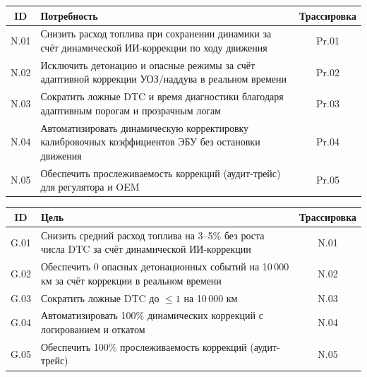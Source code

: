 \documentclass[14pt, a4paper]{extarticle}
\begin{document}
		
		\vspace{\parindent}
		\noindent
		\begin{minipage}{\textwidth}
			\label{tab:needs}
			\begin{tabularx}{\textwidth}{|c|X|c|}
				\hline
				\textbf{ID} & \textbf{Потребность} & \textbf{Трассировка} \\
				\hline
				N.01 & Снизить расход топлива при сохранении динамики за счёт динамической ИИ-коррекции по ходу движения & Pr.01 \\
				\hline
				N.02 & Исключить детонацию и опасные режимы за счёт адаптивной коррекции УОЗ/наддува в реальном времени & Pr.02 \\
				\hline
				N.03 & Сократить ложные DTC и время диагностики благодаря адаптивным порогам и прозрачным логам & Pr.03 \\
				\hline
				N.04 & Автоматизировать динамическую корректировку калибровочных коэффициентов ЭБУ без остановки движения & Pr.04 \\
				\hline
				N.05 & Обеспечить прослеживаемость коррекций (аудит-трейс) для регулятора и OEM & Pr.05 \\
				\hline
			\end{tabularx}
		\end{minipage}
		\vspace{\parindent}
		
		
		\vspace{\parindent}
		\noindent
		\begin{minipage}{\textwidth}
			\label{tab:goals}
			\begin{tabularx}{\textwidth}{|c|X|c|}
				\hline
				ID & Цель & Трассировка \\
				\hline
				G.01 & Снизить средний расход топлива на 3--5\% без роста числа DTC за счёт динамической ИИ-коррекции & N.01 \\
				\hline
				G.02 & Обеспечить 0 опасных детонационных событий на 10\,000 км за счёт коррекции в реальном времени & N.02 \\
				\hline
				G.03 & Сократить ложные DTC до \(\leq 1\) на 10\,000 км & N.03 \\
				\hline
				G.04 & Автоматизировать 100\% динамических коррекций с логированием и откатом & N.04 \\
				\hline
				G.05 & Обеспечить 100\% прослеживаемость коррекций (аудит-трейс) & N.05 \\
				\hline
			\end{tabularx}
		\end{minipage}
		\vspace{\parindent}
		
\end{document}

